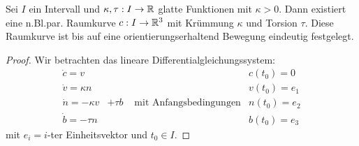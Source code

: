 \documentclass[11pt]{scrbook}
\begin{document}
\begin{st}
\label{7.9}
Sei $I$ ein Intervall und $\kappa , \tau : I \to \mathbb{R}$ glatte Funktionen mit $\kappa > 0$. Dann existiert eine n.Bl.par. Raumkurve $c: I \to \mathbb{R}^3$ mit Krümmung $\kappa$ und Torsion $\tau$. Diese Raumkurve ist bis auf eine orientierungserhaltend Bewegung eindeutig festgelegt.
\begin{proof}
Wir betrachten das lineare Differentialgleichungssystem: 
\[ \begin{matrix} \dot c = v~~ & & & c(t_0) = 0 \\ 
\dot v = \kappa n~ & & & v(t_0) = e_1       \\
\dot n = - \kappa v & + \tau b & \text{ mit Anfangsbedingungen} & n(t_0) = e_2  \\
\dot b = - \tau n & & & b(t_0) = e_3 
\end{matrix}    \]
mit $e_i = i$-ter Einheitsvektor und $t_0 \in I$. 


\end{proof}
\end{st}
\end{document}
